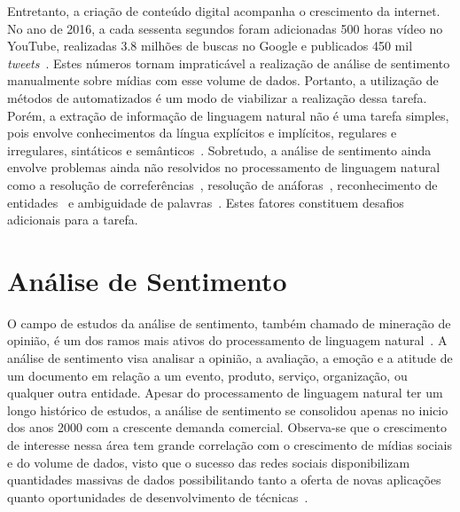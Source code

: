 Entretanto, a criação de conteúdo digital acompanha o crescimento da internet.
No ano de 2016, a cada sessenta segundos foram adicionadas 500 horas vídeo no YouTube, realizadas 3.8 milhões de buscas
no Google e publicados 450 mil \textit{tweets}~\cite{smartinsights}.
Estes números tornam impraticável a realização de análise de sentimento manualmente sobre mídias com esse volume de
dados.
Portanto, a utilização de métodos de automatizados é um modo de viabilizar a realização dessa tarefa.
Porém, a extração de informação de linguagem natural não é uma tarefa simples, pois envolve conhecimentos da língua
explícitos e implícitos, regulares e irregulares, sintáticos e semânticos~\cite{cambria13}.
Sobretudo, a análise de sentimento ainda envolve problemas ainda não resolvidos no processamento de linguagem
natural~\cite{cambria13}
como a resolução de correferências~\cite{soon01}, resolução de anáforas~\cite{lappin94}, reconhecimento de
entidades~\cite{nadeau07} e ambiguidade de palavras~\cite{yarowsky95}.
Estes fatores constituem desafios adicionais para a tarefa.

\section{Análise de Sentimento}

O campo de estudos da análise de sentimento, também chamado de mineração de opinião, é um dos ramos mais ativos do
processamento de linguagem natural~\cite{liu12}.
A análise de sentimento visa analisar a opinião, a avaliação, a emoção e a atitude de um documento em relação a um
evento, produto, serviço, organização, ou qualquer outra entidade.
Apesar do processamento de linguagem natural ter um longo histórico de estudos, a análise de sentimento se consolidou
apenas no inicio dos anos 2000 com a crescente demanda comercial.
Observa-se que o crescimento de interesse nessa área tem grande correlação com o crescimento de mídias sociais e do
volume de dados, visto que o sucesso das redes sociais disponibilizam quantidades massivas de dados possibilitando tanto
a oferta de novas aplicações quanto oportunidades de desenvolvimento de técnicas~\cite{liu12}.


